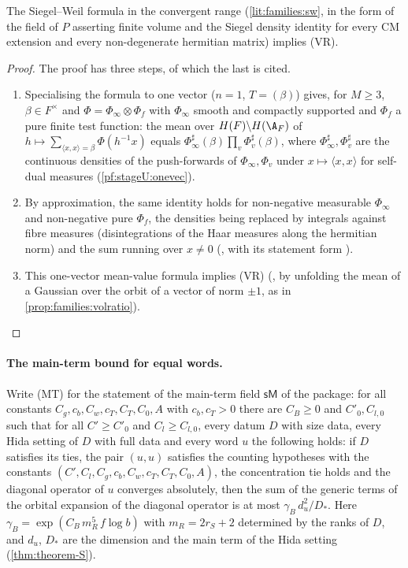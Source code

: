 \begin{proposition}\label{pf:stageU:volratio}
The Siegel--Weil formula in the convergent range (\cref{lit:families:sw}, in the form of the field of $P$ asserting finite
volume and the Siegel density identity for every CM extension and every non-degenerate hermitian matrix) implies
\textup{(VR)}.
\end{proposition}

\begin{proof}
The proof has three steps, of which the last is cited.
\begin{enumerate}[label=\arabic*.]
\item Specialising the formula to one vector ($n=1$, $T=(\beta)$) gives, for $M\ge3$, $\beta\in F^\times$ and
$\Phi=\Phi_\infty\otimes\Phi_f$ with $\Phi_\infty$ smooth and compactly supported and $\Phi_f$ a pure finite test function:
the mean over $H(F)\backslash H(\A_F)$ of $h\mapsto\sum_{\langle x,x\rangle=\beta}\Phi(h^{-1}x)$ equals
$\Phi^\sharp_\infty(\beta)\prod_v\Phi^\sharp_v(\beta)$, where $\Phi^\sharp_\infty,\Phi^\sharp_v$ are the continuous densities of the
push-forwards of $\Phi_\infty,\Phi_v$ under $x\mapsto\langle x,x\rangle$ for self-dual measures (\cref{pf:stageU:onevec}).
\item By approximation, the same identity holds for non-negative measurable $\Phi_\infty$ and non-negative pure $\Phi_f$, the
densities being replaced by integrals against fibre measures (disintegrations of the Haar measures along the hermitian
norm) and the sum running over $x\ne0$ (, with its statement form
).
\item This one-vector mean-value formula implies (VR) (, by
unfolding the mean of a Gaussian over the orbit of a vector of norm $\pm1$, as in \cref{prop:families:volratio}).
\end{enumerate}
\end{proof}

\paragraph{The main-term bound for equal words.}
Write (MT) for the statement of the main-term field $\mathsf{sM}$ of the package: for all constants
$C_g,c_b,C_w,c_T,C_T,C_0,A$ with $c_b,c_T>0$ there are $C_B\ge0$ and $C'_0,C_{l,0}$ such that for all $C'\ge C'_0$ and
$C_l\ge C_{l,0}$, every datum $D$ with size data, every Hida setting of $D$ with full data and every word $u$ the
following holds: if $D$ satisfies its ties, the pair $(u,u)$ satisfies the counting hypotheses with the constants
$(C',C_l,C_g,c_b,C_w,c_T,C_T,C_0,A)$, the concentration tie holds and the diagonal operator of $u$ converges absolutely,
then the sum of the generic terms of the orbital expansion of the diagonal operator is at most
$\gamma_B\,d_u^2/D_*$. Here $\gamma_B=\exp(C_B\,m_R^5\,f\log b)$ with $m_R=2r_S+2$ determined by the ranks of $D$, and
$d_u$, $D_*$ are the dimension and the main term of the Hida setting (\cref{thm:theorem-S}).


